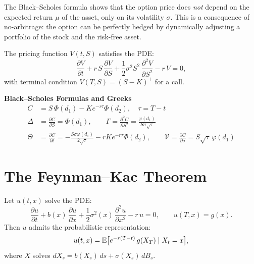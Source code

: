 \begin{intuition}
The Black--Scholes formula shows that the option price does \emph{not}
depend on the expected return $\mu$ of the asset, only on its volatility
$\sigma$. This is a consequence of no-arbitrage: the option can be
perfectly hedged by dynamically adjusting a portfolio of the stock and
the risk-free asset.
\end{intuition}

\begin{definition}
The pricing function $V(t,S)$ satisfies the PDE:
\[
  \frac{\partial V}{\partial t} + r\,S\,\frac{\partial V}{\partial S}
  + \frac{1}{2}\sigma^2 S^2\,\frac{\partial^2 V}{\partial S^2}
  - r\,V = 0,
\]
with terminal condition $V(T,S) = (S-K)^+$ for a call.
\end{definition}

\begin{keyformulas}
\textbf{Black--Scholes Formulas and Greeks}
\begin{align*}
  C &= S\,\Phi(d_1) - Ke^{-r\tau}\Phi(d_2), \quad \tau = T-t \\[4pt]
  \Delta &= \frac{\partial C}{\partial S} = \Phi(d_1), \qquad
  \Gamma = \frac{\partial^2 C}{\partial S^2}
    = \frac{\varphi(d_1)}{S\sigma\sqrt{\tau}} \\[4pt]
  \Theta &= \frac{\partial C}{\partial t}
    = -\frac{S\sigma\varphi(d_1)}{2\sqrt{\tau}}
    - rKe^{-r\tau}\Phi(d_2), \qquad
  \mathcal{V} = \frac{\partial C}{\partial\sigma}
    = S\sqrt{\tau}\,\varphi(d_1)
\end{align*}
\end{keyformulas}

\section{The Feynman--Kac Theorem}
\label{sec:feynman_kac}

\begin{theorem}
\label{thm:feynman_kac}
Let $u(t,x)$ solve the PDE:
\[
  \frac{\partial u}{\partial t} + b(x)\,\frac{\partial u}{\partial x}
  + \frac{1}{2}\sigma^2(x)\,\frac{\partial^2 u}{\partial x^2}
  - r\,u = 0, \qquad u(T,x) = g(x).
\]
Then $u$ admits the probabilistic representation:
\[
  u(t,x) = \mathbb{E}\bigl[e^{-r(T-t)}\,g(X_T) \mid X_t = x\bigr],
\]
where $X$ solves $dX_s = b(X_s)\,ds + \sigma(X_s)\,dB_s$.
\end{theorem}

